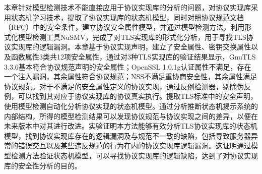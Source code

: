 本章针对模型检测技术不能直接应用于协议实现库的分析的问题，对协议实现库采用状态机学习技术，提取了协议实现库的状态机模型，同时对照协议规范文档（RFC）中的安全条件，建立协议安全属性模型，并通过模型检测方法，利用形式化模型检测工具NuSMV，完成了对TLS实现库的形式化分析，用于寻找TLS协议实现库的逻辑漏洞。本章基于协议实现声明，建立了安全属性、密钥交换属性以及函数属性3类共12项安全属性，通过对3种TLS实现库的验证结果显示，GnuTLS 3.3.6基本符合协议规范声明的安全属性；OpenSSL 1.0.1g认证属性不满足，存在一个注入漏洞，其余属性符合协议规范；NSS不满足重协商安全性，其余属性满足协议规范。对于不满足的安全属性定义的协议实现，通过反例检测器，剔除伪反例，可以找到其对应于协议实现库的协议真实执行。提取TLS标准中的安全声明，使用模型检测自动化分析协议实现的状态机模型。通过分析推断状态机揭示系统的内部结构，所得的模型检测结果可以发现协议规范与协议实现之间的差异，以便在未来版本中对其进行改进。实验证明本方法能够有效分析TLS协议实现库的状态机模型，找到协议实现库存在的逻辑漏洞及与规范不一致的缺陷，包括导致服务器异常的错误交互以及某些违反规范的行为在内的协议实现库逻辑漏洞。这证明通过模型检测方法验证状态机模型，可以寻找协议实现库的逻辑缺陷，达到了对协议实现库的安全性分析的目的。







